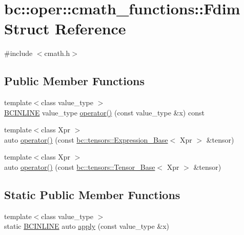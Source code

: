 \hypertarget{structbc_1_1oper_1_1cmath__functions_1_1Fdim}{}\section{bc\+:\+:oper\+:\+:cmath\+\_\+functions\+:\+:Fdim Struct Reference}
\label{structbc_1_1oper_1_1cmath__functions_1_1Fdim}


{\ttfamily \#include $<$cmath.\+h$>$}

\subsection*{Public Member Functions}
\begin{DoxyCompactItemize}
\item 
{\footnotesize template$<$class value\+\_\+type $>$ }\\\hyperlink{common_8h_a6699e8b0449da5c0fafb878e59c1d4b1}{B\+C\+I\+N\+L\+I\+NE} value\+\_\+type \hyperlink{structbc_1_1oper_1_1cmath__functions_1_1Fdim_a6a922f40e1936a467e3a2ae930694531}{operator()} (const value\+\_\+type \&x) const
\item 
{\footnotesize template$<$class Xpr $>$ }\\auto \hyperlink{structbc_1_1oper_1_1cmath__functions_1_1Fdim_a6bd57f1fc71ee8b68a0770c57cb06abf}{operator()} (const \hyperlink{classbc_1_1tensors_1_1Expression__Base}{bc\+::tensors\+::\+Expression\+\_\+\+Base}$<$ Xpr $>$ \&tensor)
\item 
{\footnotesize template$<$class Xpr $>$ }\\auto \hyperlink{structbc_1_1oper_1_1cmath__functions_1_1Fdim_a2e847f55d7f0dccf008fb967e71de633}{operator()} (const \hyperlink{classbc_1_1tensors_1_1Tensor__Base}{bc\+::tensors\+::\+Tensor\+\_\+\+Base}$<$ Xpr $>$ \&tensor)
\end{DoxyCompactItemize}
\subsection*{Static Public Member Functions}
\begin{DoxyCompactItemize}
\item 
{\footnotesize template$<$class value\+\_\+type $>$ }\\static \hyperlink{common_8h_a6699e8b0449da5c0fafb878e59c1d4b1}{B\+C\+I\+N\+L\+I\+NE} auto \hyperlink{structbc_1_1oper_1_1cmath__functions_1_1Fdim_ac4cbe6082c1f6d0be40a40b1259a1092}{apply} (const value\+\_\+type \&x)
\end{DoxyCompactItemize}


